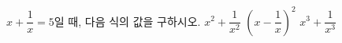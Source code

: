 $x+\dfrac{1}{x}=5$일 때, 다음 식의 값을 구하시오.
 $x^2+\dfrac{1}{x^2}$
 $\left(x-\dfrac{1}{x}\right)^2$
 $x^3+\dfrac{1}{x^3}$
